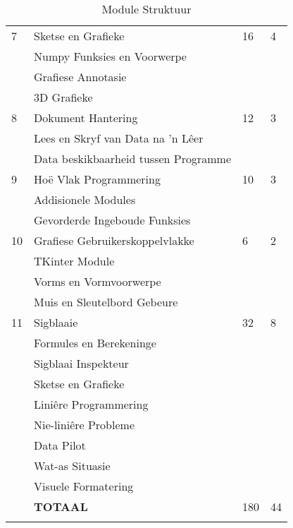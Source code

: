 \begin{longtable}{|p{1.4cm}|p{8.4cm}|p{2.2cm}|p{1.8cm}|}
             \hline
             7  & Sketse en Grafieke                        & 16 & 4 \\
                & \qquad Numpy Funksies en Voorwerpe                       &    &   \\
                & \qquad Grafiese Annotasie                  &    &   \\
                & \qquad 3D Grafieke                        &    &   \\
             \hline
             8  & Dokument Hantering                        & 12  & 3 \\
                & \qquad Lees en Skryf van Data na 'n L\^eer     &    &   \\                 
                & \qquad Data beskikbaarheid tussen Programme                        &    &   \\
             \hline
             9  & Ho\"{e} Vlak Programmering                & 10 & 3 \\
                & \qquad Addisionele Modules                &    &   \\    
                & \qquad Gevorderde Ingeboude Funksies           &    &   \\
             \hline
             10  & Grafiese Gebruikerskoppelvlakke                & 6 & 2 \\
                & \qquad TKinter Module                &    &   \\    
                & \qquad Vorms en Vormvoorwerpe          &    &   \\
                & \qquad Muis en Sleutelbord Gebeure          &    &   \\
             \hline
             11  & Sigblaaie                                 & 32 & 8 \\
                & \qquad Formules en Berekeninge            &    &   \\
                & \qquad Sigblaai Inspekteur                &    &   \\
                & \qquad Sketse en Grafieke                 &    &   \\
                & \qquad Lini\^{e}re Programmering          &    &   \\
                & \qquad Nie-lini\^{e}re Probleme  &    &   \\
                & \qquad Data Pilot                         &    &   \\
                & \qquad Wat-as Situasie                    &    &   \\
                & \qquad Visuele Formatering                &    &   \\
             \hline
                & {\bf TOTAAL}                              &180 &44 \\
             \hline
         \caption[Module Struktuur]{Module Struktuur} \label{tab:study_comp} 
        \end{longtable}

